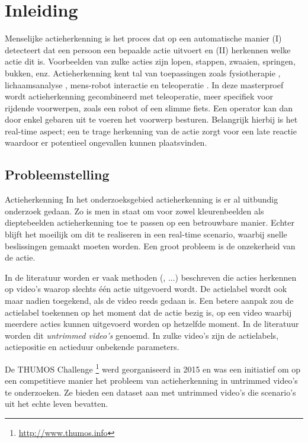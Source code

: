 \setcounter{page}{1}
\chapter{Inleiding}
\label{ch:Inleiding}
Menselijke actieherkenning is het proces dat op een automatische manier (I) detecteert dat een persoon een bepaalde actie uitvoert en (II) herkennen welke actie dit is. Voorbeelden van zulke acties zijn lopen, stappen, zwaaien, springen, bukken, enz. Actieherkenning kent tal van toepassingen zoals fysiotherapie \cite{Deboeverie2016}, lichaamsanalyse \cite{Devi2015}, mens-robot interactie \cite{Li2018} en teleoperatie \cite{Ajili2017}. In deze masterproef wordt actieherkenning gecombineerd met teleoperatie, meer specifiek voor rijdende voorwerpen, zoals een robot of een slimme fiets. Een operator kan dan door enkel gebaren uit te voeren het voorwerp besturen. Belangrijk hierbij is het real-time aspect; een te trage herkenning van de actie zorgt voor een late reactie waardoor er potentieel ongevallen kunnen plaatsvinden. 

\section{Probleemstelling}
Actieherkenning 
In het onderzoeksgebied actieherkenning is er al uitbundig onderzoek gedaan. Zo is men in staat om voor zowel kleurenbeelden als dieptebeelden actieherkenning toe te passen op een betrouwbare manier. Echter blijft het moeilijk om dit te realiseren in een real-time scenario, waarbij snelle beslissingen gemaakt moeten worden. Een groot probleem is de onzekerheid van de actie. 

In de literatuur worden er vaak methoden (\cite{Xia2012}, ...) beschreven die acties herkennen op video's waarop slechts één actie uitgevoerd wordt. De actielabel wordt ook maar nadien toegekend, als de video reeds gedaan is. Een betere aanpak zou de actielabel toekennen op het moment dat de actie bezig is, op een video waarbij meerdere acties kunnen uitgevoerd worden op hetzelfde moment. In de literatuur worden dit \textit{untrimmed video's} genoemd. In zulke video's zijn de actielabels, actiepositie en actieduur onbekende parameters.

De THUMOS Challenge \footnote{\url{http://www.thumos.info}} werd georganiseerd in 2015 en was een initiatief om op een competitieve manier het probleem van actieherkenning in untrimmed video's te onderzoeken. Ze bieden een dataset aan met untrimmed video's die scenario's uit het echte leven bevatten.

